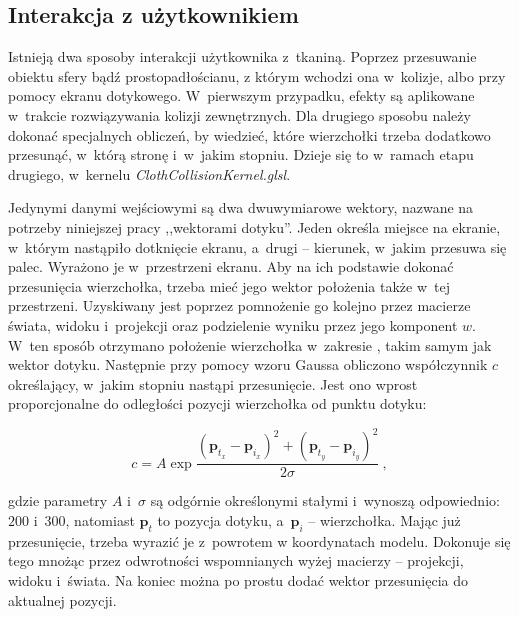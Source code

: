 		\subsection{Interakcja z użytkownikiem}
		\label{t:symulacja:dzialanie:interakcja}
			
		
		Istnieją dwa sposoby interakcji użytkownika z~tkaniną. Poprzez przesuwanie obiektu sfery bądź prostopadłościanu, z którym wchodzi ona w~kolizje, albo przy pomocy ekranu dotykowego. W~pierwszym przypadku, efekty są aplikowane w~trakcie rozwiązywania kolizji zewnętrznych. Dla drugiego sposobu należy dokonać specjalnych obliczeń, by wiedzieć, które wierzchołki trzeba dodatkowo przesunąć, w~którą stronę i~w~jakim stopniu. Dzieje się to w~ramach etapu drugiego, w~kernelu \emph{ClothCollisionKernel.glsl}.
		
		Jedynymi danymi wejściowymi są dwa dwuwymiarowe wektory, nazwane na potrzeby niniejszej pracy ,,wektorami dotyku''. Jeden określa miejsce na ekranie, w~którym nastąpiło dotknięcie ekranu, a~drugi -- kierunek, w~jakim przesuwa się palec. Wyrażono je w~przestrzeni ekranu. Aby na ich podstawie dokonać przesunięcia wierzchołka, trzeba mieć jego wektor położenia także w~tej przestrzeni. Uzyskiwany jest poprzez pomnożenie go kolejno przez macierze świata, widoku i~projekcji oraz podzielenie wyniku przez jego komponent \(w\). W~ten sposób otrzymano położenie wierzchołka w~zakresie \(<-1, 1>\), takim samym jak wektor dotyku. Następnie przy pomocy wzoru Gaussa obliczono współczynnik \(c\) określający, w~jakim stopniu nastąpi przesunięcie. Jest ono wprost proporcjonalne do odległości pozycji wierzchołka od punktu dotyku:
		
		
		\begin{equation}
		c = A\exp{\frac{(\mathbf{p}_{t_{x}} - \mathbf{p}_{i_{x}})^{2} + (\mathbf{p}_{t_{y}} - \mathbf{p}_{i_{y}})^{2}}{2 \sigma}} \ ,
		\end{equation} 
		
		gdzie parametry \( A \) i~\( \sigma \) są odgórnie określonymi stałymi i~wynoszą odpowiednio: \(200\) i~\(300\), natomiast \( \mathbf{p}_{t} \) to pozycja dotyku, a~\( \mathbf{p}_{i} \)  -- wierzchołka. Mając już przesunięcie, trzeba wyrazić je z~powrotem w koordynatach modelu. Dokonuje się tego mnożąc przez odwrotności wspomnianych wyżej macierzy -- projekcji, widoku i~świata. Na koniec można po prostu dodać wektor przesunięcia do aktualnej pozycji.
		\newpage
		
